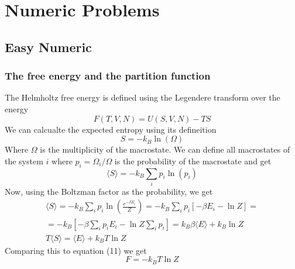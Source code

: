\documentclass{article}
\begin{document}
\section{Numeric Problems}
\subsection{Easy Numeric}
\subsubsection{The free energy and the partition function}
The Helmholtz free energy is defined using the Legendere transform over the energy
\begin{equation}
    F(T, V, N) = U(S, V, N) - TS
\end{equation}
We can calcualte the expected entropy using its defineition
\begin{equation}
    S = - k_B \ln(\Omega)
\end{equation}
Where $\Omega$ is the multiplicity of the macrostate. We can define all macrostates of the system $i$ where $p_i = \Omega_i / \Omega$ is the probability of the macrostate and get
\begin{equation}
    \langle S \rangle = - k_B \sum_i p_i \ln(p_i)
\end{equation}
Now, using the Boltzman factor as the probability, we get
\begin{equation}
\begin{gathered}
    \langle S \rangle = - k_B \sum_i p_i \ln\left(\frac{e^{-\beta E_i}}{Z}\right) = 
    - k_B \sum_i p_i \left[-\beta E_i - \ln Z\right] =
    \\
    = - k_B \left[-\beta \sum_i p_i E_i - \ln Z\sum_i p_i \right] =
    k_B \beta \langle E \rangle + k_B \ln Z
    \\
    T \langle S \rangle = \langle E \rangle + k_B T \ln Z
\end{gathered}
\end{equation}
Comparing this to equation (11) we get
\begin{equation}
    F = -k_B T \ln Z
\end{equation}
\end{document}
